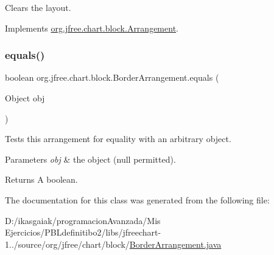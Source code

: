 Clears the layout. 

Implements \mbox{\hyperlink{interfaceorg_1_1jfree_1_1chart_1_1block_1_1_arrangement_a4db8248d65d1c074b7cf5ecc35d0f097}{org.\+jfree.\+chart.\+block.\+Arrangement}}.

\mbox{\label{classorg_1_1jfree_1_1chart_1_1block_1_1_border_arrangement_a3108798bca6c4167c95817f1743932fc}} 
\subsubsection{\texorpdfstring{equals()}{equals()}}
{\footnotesize\ttfamily boolean org.\+jfree.\+chart.\+block.\+Border\+Arrangement.\+equals (\begin{DoxyParamCaption}\item[{Object}]{obj }\end{DoxyParamCaption})}

Tests this arrangement for equality with an arbitrary object.


\begin{DoxyParams}{Parameters}
{\em obj} & the object ({\ttfamily null} permitted).\\
\hline
\end{DoxyParams}
\begin{DoxyReturn}{Returns}
A boolean. 
\end{DoxyReturn}


The documentation for this class was generated from the following file\+:\begin{DoxyCompactItemize}
\item 
D\+:/ikasgaiak/programacion\+Avanzada/\+Mis Ejercicios/\+P\+B\+Ldefinitibo2/libs/jfreechart-\/1../source/org/jfree/chart/block/\mbox{\hyperlink{_border_arrangement_8java}{Border\+Arrangement.\+java}}\end{DoxyCompactItemize}
